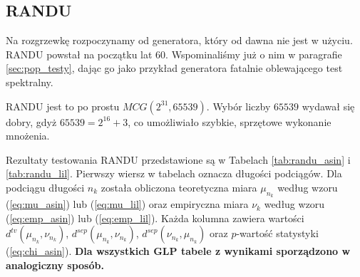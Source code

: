 \documentclass[a4paper,11pt,twoside]{book}
\theoremstyle{definition}
\begin{document}
% 
%  
%  

\subsection{RANDU}
Na rozgrzewkę rozpoczynamy od generatora, który od dawna nie jest w użyciu. RANDU powstał na początku lat 60. Wspominaliśmy już o nim w paragrafie \ref{sec:pop_testy}, dając go jako przykład generatora fatalnie oblewającego test spektralny.

RANDU jest to po prostu $MCG(2^{31}, 65539)$. Wybór liczby $65539$ wydawał się dobry, gdyż $65539 = 2^{16} + 3$, co umożliwiało szybkie, sprzętowe wykonanie mnożenia.

Rezultaty testowania RANDU przedstawione są w Tabelach \ref{tab:randu_asin} i \ref{tab:randu_lil}. Pierwszy wiersz w tabelach oznacza długości podciągów. Dla podciągu długości $n_k$ została obliczona teoretyczna miara $\mu_{n_k}$ według wzoru (\ref{eq:mu_asin}) lub (\ref{eq:mu_lil}) oraz empiryczna miara $\nu_k$ według wzoru (\ref{eq:emp_asin}) lub (\ref{eq:emp_lil}). Każda kolumna zawiera wartości $d^{tv}(\mu_{n_k}, \nu_{n_k})$, $d^{sep}(\mu_{n_k}, \nu_{n_k})$, $d^{sep}(\nu_{n_k}, \mu_{n_k})$ oraz $p$-wartość statystyki (\ref{eq:chi_asin}). \textbf{Dla wszystkich GLP tabele z wynikami sporządzono w analogiczny sposób.}
\end{document}

